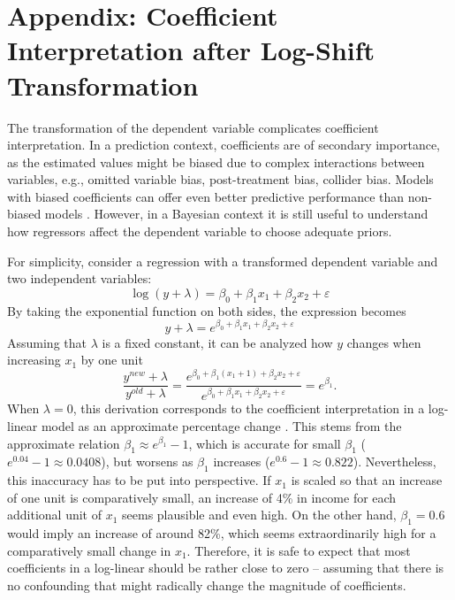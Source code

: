 \chapter{Appendix: Coefficient Interpretation after Log-Shift Transformation}
\label{appendix:coeff}
The transformation of the dependent variable complicates coefficient interpretation.
In a prediction context, coefficients are of secondary importance, as the estimated values might be biased due to complex interactions between variables, e.g., omitted variable bias, post-treatment bias, collider bias.
Models with biased coefficients can offer even better predictive performance than non-biased models \citep[Chapter 7]{mcelreath_statistical_2020}.
However, in a Bayesian context it is still useful to understand how regressors affect the dependent variable to choose adequate priors.

For simplicity, consider a regression with a transformed dependent variable and two independent variables:
\begin{equation*}
    \log(y + \lambda) = \beta_0 + \beta_1 x_1 + \beta_2 x_2 + \varepsilon
\end{equation*}
By taking the exponential function on both sides, the expression becomes
\begin{equation*}
    y + \lambda = e^{\beta_0 + \beta_1 x_1 + \beta_2 x_2 + \varepsilon}
\end{equation*}
Assuming that $\lambda$ is a fixed constant, it can be analyzed how $y$ changes when increasing $x_1$ by one unit
\begin{equation}
    \displaystyle \frac{y^{new} + \lambda}{y^{old} + \lambda} =
    \frac{e^{\beta_0 + \beta_1 (x_1 + 1) + \beta_2 x_2 + \varepsilon}}
    {e^{\beta_0 + \beta_1 x_1 + \beta_2 x_2 + \varepsilon}} = e^{\beta_1}.
\end{equation}
When $\lambda = 0$, this derivation corresponds to the coefficient interpretation in a log-linear model as an approximate percentage change \cite[Chapter 8]{stock_introduction_2015}.
This stems from the approximate relation $\beta_1 \approx e^{\beta_1} - 1$, which is accurate for small $\beta_1$ ($e^{0.04} - 1 \approx 0.0408$), but worsens as $\beta_1$ increases ($e^{0.6} - 1 \approx 0.822$).
Nevertheless, this inaccuracy has to be put into perspective.
If $x_1$ is scaled so that an increase of one unit is comparatively small, an increase of 4\% in income for each additional unit of $x_1$ seems plausible and even high.
On the other hand, $\beta_1 = 0.6$ would imply an increase of around 82\%, which seems extraordinarily high for a comparatively small change in $x_1$.
Therefore, it is safe to expect that most coefficients in a log-linear should be rather close to zero – assuming that there is no confounding that might radically change the magnitude of coefficients.

